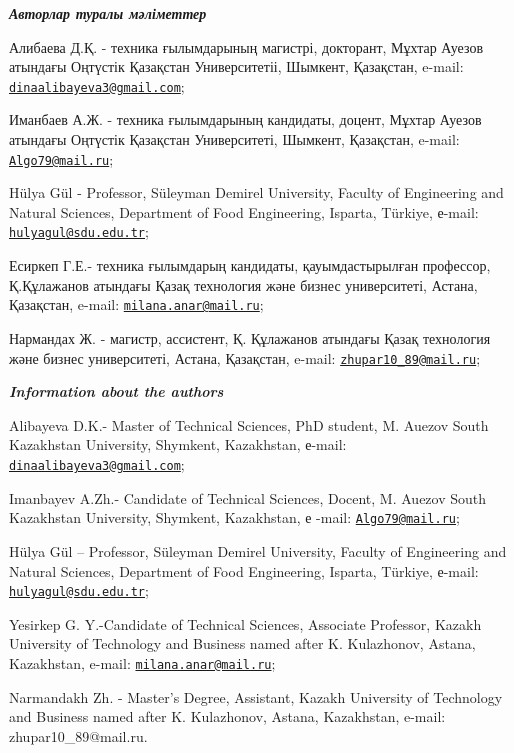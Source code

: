 \begin{authorinfo}
\emph{{\bfseries Авторлар туралы мәліметтер}}

Алибаева Д.Қ. - техника ғылымдарының магистрі, докторант, Мұхтар Ауезов
атындағы Оңтүстік Қазақстан Университетіі, Шымкент, Қазақстан, e-mail:
\href{mailto:dinaalibayeva3@gmail.com}{\nolinkurl{dinaalibayeva3@gmail.com}};

Иманбаев А.Ж. - техника ғылымдарының кандидаты, доцент, Мұхтар Ауезов
атындағы Оңтүстік Қазақстан Университеті, Шымкент, Қазақстан, e-mail:
\href{mailto:Algo79@mail.ru}{\nolinkurl{Algo79@mail.ru}};

Hülya Gül - Professor, Süleyman Demirel University, Faculty of
Engineering and Natural Sciences, Department of Food Engineering,
Isparta, Türkiye, е-mail:
\href{mailto:hulyagul@sdu.edu.tr}{\nolinkurl{hulyagul@sdu.edu.tr}};

Есиркеп Г.Е.- техника ғылымдарың кандидаты, қауымдастырылған профессор,
Қ.Құлажанов атындағы Қазақ технология және бизнес университеті, Астана,
Қазақстан, e-mail:
\href{mailto:milana.anar@mail.ru}{\nolinkurl{milana.anar@mail.ru}};

Нармандах Ж. - магистр, ассистент, Қ. Құлажанов атындағы Қазақ
технология және бизнес университеті, Астана, Қазақстан, e-mail:
\href{mailto:zhupar10_89@mail.ru}{\nolinkurl{zhupar10\_89@mail.ru}};

\emph{{\bfseries Information about the authors}}

Alibayeva D.K.- Master of Technical Sciences, PhD student, M. Auezov
South Kazakhstan University, Shymkent, Kazakhstan, е-mail:
\href{mailto:dinaalibayeva3@gmail.com}{\nolinkurl{dinaalibayeva3@gmail.com}};

Imanbayev A.Zh.- Candidate of Technical Sciences, Docent, M. Auezov
South Kazakhstan University, Shymkent, Kazakhstan, е -mail:
\href{mailto:Algo79@mail.ru}{\nolinkurl{Algo79@mail.ru}};

Hülya Gül -- Professor, Süleyman Demirel University, Faculty of
Engineering and Natural Sciences, Department of Food Engineering,
Isparta, Türkiye, е-mail:
\href{mailto:hulyagul@sdu.edu.tr}{\nolinkurl{hulyagul@sdu.edu.tr}};

Yesirkep G. Y.-Candidate of Technical Sciences, Associate Professor,
Kazakh University of Technology and Business named after K. Kulazhonov,
Astana, Kazakhstan, e-mail:
\href{mailto:milana.anar@mail.ru}{\nolinkurl{milana.anar@mail.ru}};

Narmandakh Zh. - Master's Degree, Assistant, Kazakh University of
Technology and Business named after K. Kulazhonov, Astana, Kazakhstan,
e-mail: zhupar10\_89@mail.ru.
\end{authorinfo}

